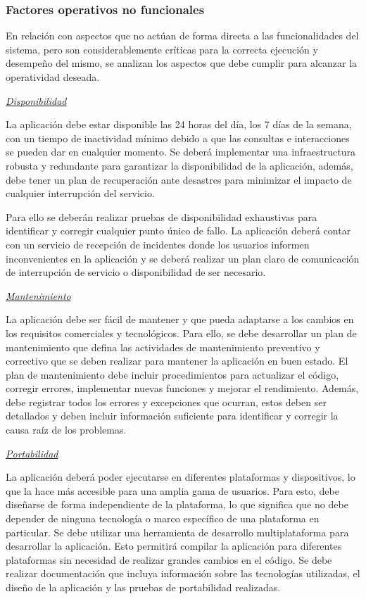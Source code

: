 \documentclass[a4paper,12pt]{article}
\newcommand{\saltolinea}{\par\vspace{\baselineskip}}
\begin{document}
    \subsubsection{Factores operativos no funcionales}
    \par En relación con aspectos que no actúan de forma directa a las funcionalidades del sistema, pero son considerablemente críticas para la correcta ejecución y desempeño del mismo, se analizan los aspectos que debe cumplir para alcanzar la operatividad deseada.
    \saltolinea
    \par \noindent \textit{\underline{Disponibilidad}} 
    \saltolinea
    \par La aplicación debe estar disponible las 24 horas del día, los 7 días de la semana, con un tiempo de inactividad mínimo debido a que las consultas e interacciones se pueden dar en cualquier momento. Se deberá implementar una infraestructura robusta y redundante para garantizar la disponibilidad de la aplicación, además, debe tener un plan de recuperación ante desastres para minimizar el impacto de cualquier interrupción del servicio.
    \par Para ello se deberán realizar pruebas de disponibilidad exhaustivas para identificar y corregir cualquier punto único de fallo. La aplicación deberá contar con un servicio de recepción de incidentes donde los usuarios informen inconvenientes en la aplicación y se deberá realizar un plan claro de comunicación de interrupción de servicio o disponibilidad de ser necesario.
    \saltolinea
    \par \noindent \textit{\underline{Mantenimiento}} 
    \saltolinea
    \par La aplicación debe ser fácil de mantener y que pueda adaptarse a los cambios en los requisitos comerciales y tecnológicos. Para ello, se debe desarrollar un plan de mantenimiento que defina las actividades de mantenimiento preventivo y correctivo que se deben realizar para mantener la aplicación en buen estado. El plan de mantenimiento debe incluir procedimientos para actualizar el código, corregir errores, implementar nuevas funciones y mejorar el rendimiento. Además, debe registrar todos los errores y excepciones que ocurran, estos deben ser detallados y deben incluir información suficiente para identificar y corregir la causa raíz de los problemas.
    \saltolinea
    \par \noindent \textit{\underline{Portabilidad}} 
    \saltolinea
    \par La aplicación deberá poder ejecutarse en diferentes plataformas y dispositivos, lo que la hace más accesible para una amplia gama de usuarios. Para esto, debe diseñarse de forma independiente de la plataforma, lo que significa que no debe depender de ninguna tecnología o marco específico de una plataforma en particular. Se debe utilizar una herramienta de desarrollo multiplataforma para desarrollar la aplicación. Esto permitirá compilar la aplicación para diferentes plataformas sin necesidad de realizar grandes cambios en el código. Se debe realizar documentación que incluya información sobre las tecnologías utilizadas, el diseño de la aplicación y las pruebas de portabilidad realizadas.
\end{document}
